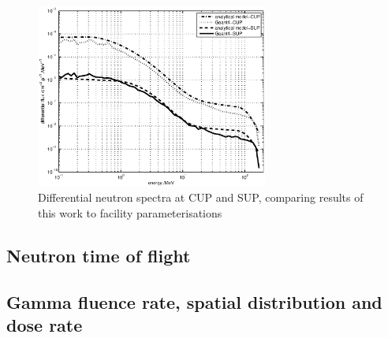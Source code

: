 \documentclass[12pt,journal]{IEEEtran}
\let\MYoriglatexcaption\caption
\renewcommand{\caption}[2][\relax]{\MYoriglatexcaption[#2]{#2}}
\begin{document}
\begin{figure}[t]
    \centering
    \includegraphics[width=3in]{DiffYieldComparedSUPCUP10.eps}
    \caption{Differential neutron spectra at CUP and SUP, comparing results of this work to facility parameterisations~\cite{Prokofiev2009,Prokofiev14}}
    \label{fig:DifferentialSpectra}
\end{figure}

\subsection{Neutron time of flight}

\subsection{Gamma fluence rate, spatial distribution and dose rate}
\end{document}
